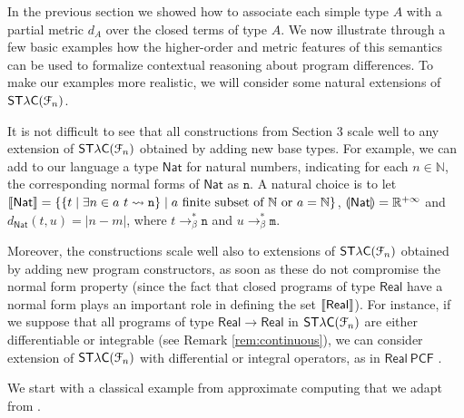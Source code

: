 

In the previous section we showed how to associate each simple type $A$ with a  partial metric $d_{A}$ over the closed terms of type $A$. 
We  now illustrate through a few basic examples how the higher-order and metric features of this semantics can be used to formalize contextual reasoning about program differences.
To make our examples more realistic, we will consider some natural extensions of $\mathsf{ST\lambda C}(\mathcal F_{n})$.

It is not difficult to see that all constructions from Section 3 scale well to any extension of $\mathsf{ST\lambda C}(\mathcal F_{n})$ obtained by adding new base types. For example, we can add to our language a type $\mathsf{Nat}$ for natural numbers, indicating for each $n\in \mathbb N$, the corresponding normal forms of $\mathsf{Nat}$ as $\mathtt n$. A natural choice is to let   
$\llbracket \mathsf{Nat} \rrbracket=\{ \{ t \mid \exists n\in a \ t\leadsto \mathtt n\}\mid a \text{ finite subset of }\mathbb N \text{ or }a=\mathbb N\}$, $\llparenthesis \mathsf{Nat} \rrparenthesis=\mathbb R^{+\infty}$ and $d_{\mathsf{Nat}}(t,u)=| n-m|$, where $t\to^{*}_{\beta}\mathtt n$ and $u\to^{*}_{\beta}\mathtt m$. 

Moreover, the constructions scale well also to extensions of $\mathsf{ST\lambda C}(\mathcal F_{n})$ obtained by adding new program constructors, as soon as these do not compromise the normal form property (since the fact that closed programs of type $\mathsf{Real}$ have a normal form plays an important role in defining the set $\llbracket \mathsf{Real} \rrbracket$).  
For instance, if we suppose that all programs of type $\mathsf{Real}\to\mathsf{Real}$ in $\mathsf{ST\lambda C}(\mathcal F_{n})$ are either 
differentiable or integrable (see Remark \ref{rem:continuous}), we can consider extension of $\mathsf{ST\lambda C}(\mathcal F_{n})$ with  differential or integral operators, as in $\mathsf{Real\ PCF}$ \cite{Di-Gianantonio:2013aa, Edalat:2000aa}.



We start with a classical example from approximate computing that we adapt from \cite{chaudhuri}. 


